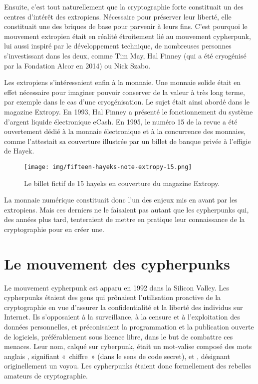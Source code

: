 Ensuite, c'est tout naturellement que la cryptographie forte constituait un des centres d'intérêt des extropiens. Nécessaire pour préserver leur liberté, elle constituait une des briques de base pour parvenir à leurs fins. C'est pourquoi le mouvement extropien était en réalité étroitement lié au mouvement cypherpunk, lui aussi inspiré par le développement technique, de nombreuses personnes s'investissant dans les deux, comme Tim May, Hal Finney (qui a été cryogénisé par la Fondation Alcor en 2014) ou Nick Szabo.

Les extropiens s'intéressaient enfin à la monnaie. Une monnaie solide était en effet nécessaire pour imaginer pouvoir conserver de la valeur à très long terme, par exemple dans le cas d'une cryogénisation. Le sujet était ainsi abordé dans le magazine Extropy. En 1993, Hal Finney a présenté le fonctionnement du système d'argent liquide électronique eCash. En 1995, le numéro 15 de la revue a été ouvertement dédié à la monnaie électronique et à la concurrence des monnaies, comme l'attestait sa couverture illustrée par un billet de banque privée à l'effigie de Hayek.

\begin{figure}[h]
  \centering
  \texttt{[image: img/fifteen-hayeks-note-extropy-15.png]}
  \caption{Le billet fictif de 15 hayeks en couverture du magazine Extropy.}
\end{figure}

La monnaie numérique constituait donc l'un des enjeux mis en avant par les extropiens. Mais ces derniers ne le faisaient pas autant que les cypherpunks qui, des années plus tard, tenteraient de mettre en pratique leur connaissance de la cryptographie pour en créer une.

\section*{Le mouvement des cypherpunks}

Le mouvement cypherpunk est apparu en 1992 dans la Silicon Valley. Les cypherpunks étaient des gens qui prônaient l'utilisation proactive de la cryptographie en vue d'assurer la confidentialité et la liberté des individus sur Internet. Ils s'opposaient à la surveillance, à la censure et à l'exploitation des données personnelles, et préconisaient la programmation et la publication ouverte de logiciels, préférablement sous licence libre, dans le but de combattre ces menaces. Leur nom, calqué sur cyberpunk, était un mot-valise composé des mots anglais , signifiant «~chiffre~» (dans le sens de code secret), et , désignant originellement un voyou. Les cypherpunks étaient donc formellement des rebelles amateurs de cryptographie.

